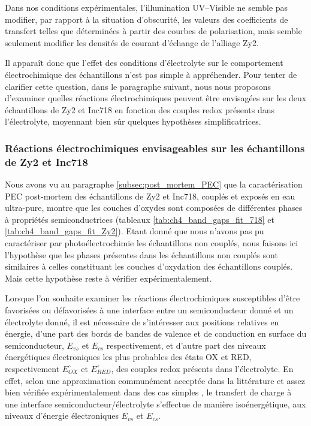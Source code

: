 \begin{refsection}
    
    Dans nos conditions expérimentales, l’illumination UV--Visible ne semble pas modifier, par rapport à la situation
    d’obscurité, les valeurs des coefficients de transfert telles que déterminées à partir des courbes de polarisation,
    mais semble seulement modifier les densités de courant d’échange de l’alliage Zy2.

    Il apparaît donc que l’effet des conditions d’électrolyte sur le comportement électrochimique des échantillons n’est
    pas simple à appréhender. Pour tenter de clarifier cette question, dans le paragraphe suivant, nous nous proposons
    d’examiner quelles réactions électrochimiques peuvent être envisagées sur les deux échantillons de Zy2 et Inc718 en
    fonction des couples redox présents dans l’électrolyte, moyennant bien sûr quelques hypothèses simplificatrices.
    
    \subsubsection{Réactions électrochimiques envisageables sur les échantillons de Zy2 et Inc718}
    \label{subsec:ch4_oxygen_summary_reactions}

    Nous avons vu au paragraphe \ref{subsec:post_mortem_PEC} que la caractérisation PEC post-mortem des échantillons de Zy2 et Inc718, couplés et
    exposés en eau ultra-pure, montre que les couches d’oxydes sont composées de différentes phases à propriétés
    semiconductrices (tableaux \ref{tab:ch4_band_gaps_fit_718} et \ref{tab:ch4_band_gaps_fit_Zy2}).
    Etant donné que nous n’avons pas pu caractériser par photoélectrochimie
    les échantillons non couplés, nous faisons ici l’hypothèse que les phases présentes dans les échantillons non couplés
    sont similaires à celles constituant les couches d’oxydation des échantillons couplés. Mais cette hypothèse reste à
    vérifier expérimentalement.

    Lorsque l’on souhaite examiner les réactions électrochimiques susceptibles d’être favorisées ou défavorisées à une
    interface entre un semiconducteur donné et un électrolyte donné, il est nécessaire de s’intéresser aux positions
    relatives en énergie, d’une part des bords de bandes de valence et de conduction en surface du semiconducteur,
    $E_{vs}$  et $E_{cs}$
    respectivement, et d’autre part des niveaux énergétiques électroniques les plus probables des états OX et RED,
    respectivement $E^{\circ}_{OX}$ et $E^{\circ}_{RED}$, des couples redox présents dans l’électrolyte. En effet, selon une approximation
    communément acceptée dans la littérature et assez bien vérifiée expérimentalement dans des cas simples
    \citep{Memming2008, Morrison1980, Gerischer1989, Gomes1973},
    le transfert de charge à une interface semiconducteur/électrolyte s’effectue de manière isoénergétique, aux
    niveaux d’énergie électroniques $E_{vs}$ et $E_{cs}$.


\end{refsection}
